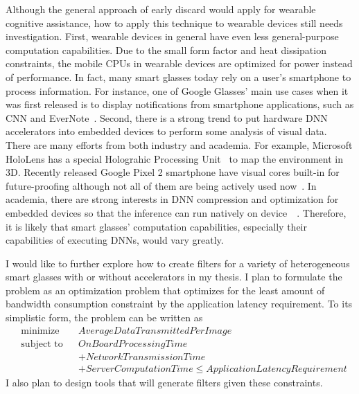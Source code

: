 Although the general approach of early discard would apply for wearable
cognitive assistance, how to apply this technique to wearable devices still
needs investigation. First, wearable devices in general have even less
general-purpose computation capabilities. Due to the small form factor and heat
dissipation constraints, the mobile CPUs in wearable devices are optimized for
power instead of performance. In fact, many smart glasses today rely on a user's
smartphone to process information. For instance, one of Google Glasses' main use
cases when it was first released is to display notifications from smartphone
applications, such as CNN and EverNote~\cite{theverge2013}. Second, there is a
strong trend to put hardware DNN accelerators into embedded devices to perform
some analysis of visual data. There are many efforts from both industry and
academia. For example, Microsoft HoloLens has a special Holograhic Processing
Unit~\cite{theregister2016} to map the environment in 3D. Recently released
Google Pixel 2 smartphone have visual cores built-in for future-proofing although
not all of them are being actively used now~\cite{androidcentral2017}. In
academia, there are strong interests in DNN compression and optimization for
embedded devices so that the inference can run natively on
device~\cite{han2015deep}~\cite{han2016eie}. Therefore, it is likely that smart
glasses' computation capabilities, especially their capabilities of executing
DNNs, would vary greatly.

I would like to further explore how to create filters for a variety of
heterogeneous smart glasses with or without accelerators in my thesis. I plan to
formulate the problem as an optimization problem that optimizes for the least
amount of bandwidth consumption constraint by the application latency requirement.
To its simplistic form, the problem can be written as
\begin{equation*}
\begin{aligned}
& \text{minimize} & & AverageDataTransmittedPerImage \\
& \text{subject to} 
  & & OnBoard Processing Time \\
  & & & + Network Transmission Time \\
  & & & + Server Computation Time \leq Application Latency Requirement 
\end{aligned}
\end{equation*}
I also plan to design tools that will generate filters given these constraints.

